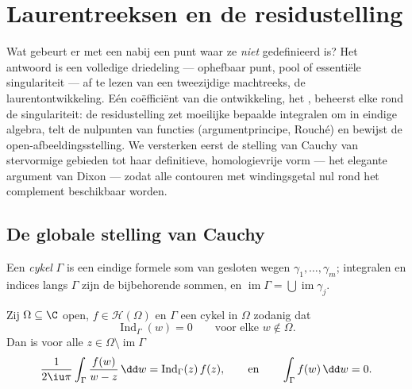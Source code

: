 \chapter{Laurentreeksen en de residustelling}
\label{ch:b3:residues}

Wat gebeurt er met een  nabij een punt waar ze
\emph{niet} gedefinieerd is? Het antwoord is een volledige
driedeling --- ophefbaar punt, pool of essentiële singulariteit
--- af te lezen van een tweezijdige machtreeks, de
laurentontwikkeling. Eén coëfficiënt van die ontwikkeling, het
\emph{}, beheerst elke  rond de
singulariteit: de residustelling zet moeilijke bepaalde
integralen om in eindige algebra, telt de nulpunten van functies
(argumentprincipe, Rouché) en bewijst de open-afbeeldingsstelling.
We versterken eerst de stelling van Cauchy van stervormige
gebieden tot haar definitieve, homologievrije vorm --- het
elegante argument van Dixon --- zodat alle contouren met
windingsgetal nul rond het complement beschikbaar worden.

\section{De globale stelling van Cauchy}

Een \emph{cykel} $\Gamma$ is een eindige formele som
van gesloten wegen $\gamma_1, \dots, \gamma_m$; integralen en
indices langs $\Gamma$ zijn de bijbehorende sommen, en
$\operatorname{im}\Gamma = \bigcup\operatorname{im}\gamma_j$.

\begin{theorem}
\label{thm:b3:residues:globalcauchy}
Zij $\Omega \subseteq \C$ open, $f \in \mathcal H(\Omega)$ en
$\Gamma$ een cykel in $\Omega$ zodanig dat
\[
\operatorname{Ind}_\Gamma(w) = 0
\qquad\text{voor elke } w \notin \Omega .
\]
Dan is voor alle $z \in \Omega\setminus\operatorname{im}\Gamma$
\[
\frac1{2\iu\pi}\int_\Gamma\frac{f(w)}{w - z}\,\dd w =
\operatorname{Ind}_\Gamma(z)\,f(z),
\qquad\text{en}\qquad
\int_\Gamma f(w)\,\dd w = 0 .
\]
\end{theorem}

